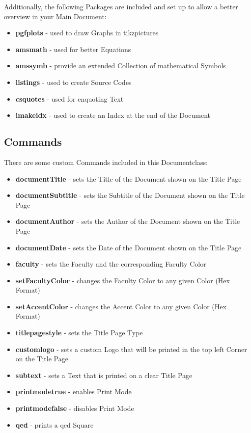 \documentclass[a4paper]{../uulm-document}
\begin{document}
Additionally, the following Packages are included and set up to allow a better overview in your Main Document:
\begin{itemize}
\item \textbf{pgfplots} - used to draw Graphs in tikzpictures
\item \textbf{amsmath} - used for better Equations
\item \textbf{amssymb} - provide an extended Collection of mathematical Symbols
\item \textbf{listings} - used to create Source Codes
\item \textbf{csquotes} - used for enquoting Text
\item \textbf{imakeidx} - used to create an Index at the end of the Document
\end{itemize}

\subsection{Commands}
There are some custom Commands included in this Documentclass:
\begin{itemize}
\item \textbf{documentTitle} - sets the Title of the Document shown on the Title Page
\item \textbf{documentSubtitle} - sets the Subtitle of the Document shown on the Title Page
\item \textbf{documentAuthor} - sets the Author of the Document shown on the Title Page
\item \textbf{documentDate} - sets the Date of the Document shown on the Title Page
\item \textbf{faculty} - sets the Faculty and the corresponding Faculty Color
\item \textbf{setFacultyColor} - changes the Faculty Color to any given Color (Hex Format)
\item \textbf{setAccentColor} - changes the Accent Color to any given Color (Hex Format)
\item \textbf{titlepagestyle} - sets the Title Page Type
\item \textbf{customlogo} - sets a custom Logo that will be printed in the top left Corner on the Title Page
\item \textbf{subtext} - sets a Text that is printed on a clear Title Page
\item \textbf{printmodetrue} - enables Print Mode
\item \textbf{printmodefalse} - disables Print Mode
\item \textbf{qed} - prints a qed Square
\end{itemize}
\end{document}
